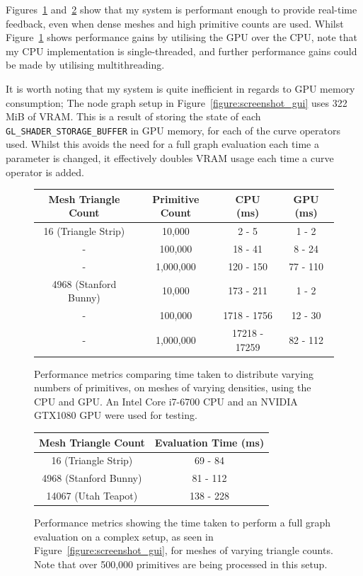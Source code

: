 \documentclass[]{acmsiggraph}
\begin{document}
Figures~\ref{figure:distributionPerformance} and~\ref{figure:fullPerformance} show that my system is performant enough to provide real-time feedback, even when dense meshes and high primitive counts are used. Whilst Figure~\ref{figure:distributionPerformance} shows performance gains by utilising the GPU over the CPU, note that my CPU implementation is single-threaded, and further performance gains could be made by utilising multithreading.

It is worth noting that my system is quite inefficient in regards to GPU memory consumption; The node graph setup in Figure~\ref{figure:screenshot_gui} uses 322 MiB of VRAM. This is a result of storing the state of each \texttt{GL\_SHADER\_STORAGE\_BUFFER} in GPU memory, for each of the curve operators used. Whilst this avoids the need for a full graph evaluation each time a parameter is changed, it effectively doubles VRAM usage each time a curve operator is added.

\begin{figure}[htbp]\centering
\begin{center}
\begin{tabular}{||c||c|c|c||}
\hline
Mesh Triangle Count & Primitive Count & CPU (ms) & GPU (ms)\\
\hline
\hline
16 (Triangle Strip) & 10,000 & 2 - 5 & 1 - 2\\
\hline
 - & 100,000 & 18 - 41 & 8 - 24\\
\hline
 - & 1,000,000 & 120 - 150 & 77 - 110\\
\hline
4968 (Stanford Bunny) & 10,000 & 173 - 211 & 1 - 2\\
\hline
 - & 100,000 & 1718 - 1756 & 12 - 30\\
\hline
 - & 1,000,000 & 17218 - 17259 & 82 - 112\\
\hline
\end{tabular}
\caption{\label{figure:distributionPerformance} Performance metrics comparing time taken to distribute varying numbers of primitives, on meshes of varying densities, using the CPU and GPU. An Intel Core i7-6700 CPU and an NVIDIA GTX1080 GPU were used for testing.}
\end{center}
\end{figure}

\begin{figure}[htbp]\centering
\begin{center}
\begin{tabular}{||c|c||}
\hline
Mesh Triangle Count & Evaluation Time (ms)\\
\hline
\hline
16 (Triangle Strip) & 69 - 84\\
\hline
4968 (Stanford Bunny) & 81 - 112\\
\hline
14067 (Utah Teapot) & 138 - 228\\
\hline
\end{tabular}
\caption{\label{figure:fullPerformance} Performance metrics showing the time taken to perform a full graph evaluation on a complex setup, as seen in Figure~\ref{figure:screenshot_gui}, for meshes of varying triangle counts. Note that over 500,000 primitives are being processed in this setup.}
\end{center}
\end{figure}
\end{document}
